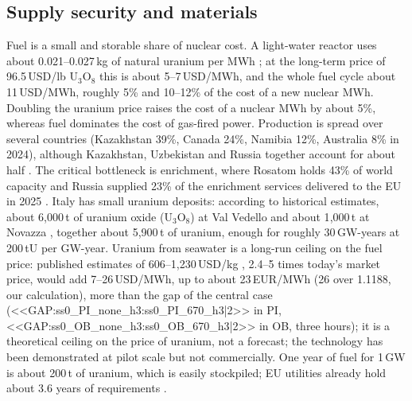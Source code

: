 \subsection{Supply security and materials}
Fuel is a small and storable share of nuclear cost. A light-water reactor uses about 0.021--0.027\,kg of natural uranium per MWh \citep{WNAecon}; at the long-term price of 96.5\,USD/lb U$_3$O$_8$ \citep{Cameco2026} this is about 5--7\,USD/MWh, and the whole fuel cycle about 11\,USD/MWh, roughly 5\% and 10--12\% of the cost of a new nuclear MWh. Doubling the uranium price raises the cost of a nuclear MWh by about 5\%, whereas fuel dominates the cost of gas-fired power. Production is spread over several countries (Kazakhstan 39\%, Canada 24\%, Namibia 12\%, Australia 8\% in 2024), although Kazakhstan, Uzbekistan and Russia together account for about half \citep{WNAmining}. The critical bottleneck is enrichment, where Rosatom holds 43\% of world capacity and Russia supplied 23\% of the enrichment services delivered to the EU in 2025 \citep{WNAenrich,ESA2025}. Italy has small uranium deposits: according to historical estimates, about 6{,}000\,t of uranium oxide (U$_3$O$_8$) at Val Vedello and about 1{,}000\,t at Novazza \citep{Geopop2026}, together about 5{,}900\,t of uranium, enough for roughly 30\,GW-years at 200\,tU per GW-year. Uranium from seawater is a long-run ceiling on the fuel price: published estimates of 606--1{,}230\,USD/kg \citep{SchneiderGill2014,Schneider2013}, 2.4--5 times today's market price, would add 7--26\,USD/MWh, up to about 23\,EUR/MWh (26 over 1.1188, our calculation), more than the gap of the central case (<<GAP:ss0_PI_none_h3:ss0_PI_670_h3|2>> in PI, <<GAP:ss0_OB_none_h3:ss0_OB_670_h3|2>> in OB, three hours); it is a theoretical ceiling on the price of uranium, not a forecast; the technology has been demonstrated at pilot scale but not commercially. One year of fuel for 1\,GW is about 200\,t of uranium, which is easily stockpiled; EU utilities already hold about 3.6 years of requirements \citep{ESA2025}.

